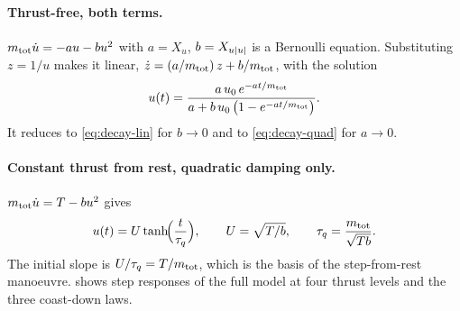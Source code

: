 \paragraph{Thrust-free, both terms.} $m_\mathrm{tot}\dot u = -a u - b u^2$ with $a = X_u$, $b = X_{u|u|}$
is a Bernoulli equation. Substituting $z = 1/u$ makes it linear,
$\dot z = (a/m_\mathrm{tot})\,z + b/m_\mathrm{tot}$, with the solution
\begin{equation}
  u(t) = \frac{a\,u_0\,e^{-a t/m_\mathrm{tot}}}{a + b\,u_0\,\bigl(1 - e^{-a t/m_\mathrm{tot}}\bigr)} .
  \label{eq:decay-both}
\end{equation}
It reduces to \eqref{eq:decay-lin} for $b\to0$ and to \eqref{eq:decay-quad} for $a\to0$.

\paragraph{Constant thrust from rest, quadratic damping only.} $m_\mathrm{tot}\dot u = T - b u^2$ gives
\begin{equation}
  u(t) = U\tanh\!\Bigl(\frac{t}{\tau_q}\Bigr), \qquad U = \sqrt{T/b}, \qquad \tau_q = \frac{m_\mathrm{tot}}{\sqrt{T b}} .
  \label{eq:tanh}
\end{equation}
The initial slope is $U/\tau_q = T/m_\mathrm{tot}$, which is the basis of the step-from-rest
manoeuvre.  shows step responses of the full model at four thrust levels and
the three coast-down laws.

